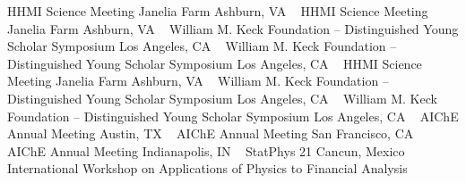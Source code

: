\GapNoBreak
{}
HHMI Science Meeting
\newline
    Janelia Farm
    \newline
Ashburn, VA
\newline
~
\Gap
{}
HHMI Science Meeting
\newline
    Janelia Farm
    \newline
Ashburn, VA
\newline
~
\Gap
{}
William M. Keck Foundation -- Distinguished Young Scholar Symposium
\newline
Los Angeles, CA
\newline
~
\Gap
{}
William M. Keck Foundation -- Distinguished Young Scholar Symposium
\newline
Los Angeles, CA
\newline
~
\Gap
{}
HHMI Science Meeting
\newline
    Janelia Farm
    \newline
Ashburn, VA
\newline
~
\Gap
{}
William M. Keck Foundation -- Distinguished Young Scholar Symposium
\newline
Los Angeles, CA
\newline
~
\Gap
{}
William M. Keck Foundation -- Distinguished Young Scholar Symposium
\newline
Los Angeles, CA
\newline
~
\Gap
{}
AIChE Annual Meeting
\newline
Austin, TX
\newline
~
\Gap
{}
AIChE Annual Meeting
\newline
San Francisco, CA
\newline
~
\Gap
{}
AIChE Annual Meeting
\newline
Indianapolis, IN
\newline
~
\Gap
{}
StatPhys 21
\newline
Cancun, Mexico
\newline
~
\Gap
{}
International Workshop on Applications of Physics to Financial Analysis
\newline
